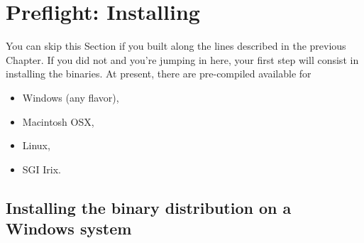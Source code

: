 
\chapter{Preflight: Installing \FlightGear{} \label{prefligh}}

You can skip this Section if you built \FlightGear{} along the lines described in the
previous Chapter. If you did not and you're jumping in here, your first step will consist in
installing the binaries. At present, there are pre-compiled  available
for

\begin{itemize}
\item Windows (any flavor),
\item Macintosh OSX,
\item Linux,
\item SGI Irix.
\end{itemize}

\section{Installing the binary distribution on a Windows system}

